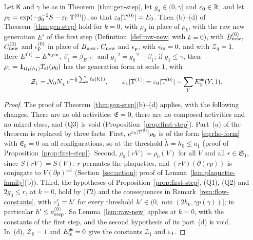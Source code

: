\begin{proposition}\label{prop:gen-one}
Let $\mathsf K$ and $\gamma$ be as in Theorem~\ref{thm:gen-step}, let $g_0\in(0,\gamma]$ and $\varepsilon_0\in\mathbb R$, and let $\rho_0=\exp(-g_0^{-2}S-\varepsilon_0|\mathbb T^{(0)}|)$, so that $\varepsilon_0|\mathbb T^{(0)}|=E_0$. Then (b)--(d) of Theorem~\ref{thm:gen-step} hold for $k=0$, with $\rho_0$ in place of $\rho_k$, with the raw new generation $E'$ of the first step (Definition~\ref{def:raw-new} with $k=0$), with $B^{(0)}_{\rm new}$, $C^{(0)}_{\rm new}$ and $\epsilon^{(0)}_{\rm p}$ in place of $B_{\rm new}$, $C_{\rm new}$ and $\epsilon_{\rm p}$, with $\epsilon_{\rm m}=0$, and with $\mathcal Z_0=1$. Here $E^{(1)}=E'^{\rm sym}$, $\beta_1=\beta_{E^{(1)}}$ and $g_1^{-2}=g_0^{-2}-\beta_1$; if $g_1\le\gamma$, then $\rho_1=\mathbf 1_{\mathfrak U_1(h_1)}T_{\rm sf}(\rho_0)$ has the generation form at scale $1$, with
\[
\mathcal Z_1=\mathcal N_0N_\chi\,e^{-\frac12\sum_b\ell_0(b;1)},\qquad\varepsilon_1|\mathbb T^{(1)}|=\varepsilon_0|\mathbb T^{(0)}|-\sum_YE^\#_{\rm p}(Y,1).
\]
\end{proposition}

\begin{proof}
The proof of Theorem~\ref{thm:gen-step}(b)--(d) applies, with the following changes. There are no old activities: $\mathfrak E=0$, there are no composed activities and no mixed class, and (Q3) is void (Proposition~\ref{prop:first-step}). Part~(a) of the theorem is replaced by three facts. First, $e^{\varepsilon_0|\mathbb T^{(0)}|}\rho_0$ is of the form \eqref{eq:rho-form} with $\mathfrak E_0=0$ on all configurations, so at the threshold $\tilde h=h_0\le a_1$ (proof of Proposition~\ref{prop:first-step}). Second, $\rho_0(rV)=\rho_0(V)$ for all $V$ and all $r\in\mathfrak S_1$, since $S(rV)=S(V)$: $r$ permutes the plaquettes, and $(rV)(\partial(rp))$ is conjugate to $V(\partial p)^{\pm1}$ (Section~\ref{sec:action}; proof of Lemma~\ref{lem:plaquette-family}(b)). Third, the hypotheses of Proposition~\ref{prop:first-step}, (Q1), (Q2) and $2g_0\le r_t$ at $k=0$, hold by ($\Gamma$2) and the consequences in Remark~\ref{rem:flow-constants}, with $\varepsilon'_1=h'$ for every threshold $h'\in(0,\min(2h_0,\gamma p(\gamma))]$; in particular $h'\le a^{(0)}_{\rm step}$. So Lemma~\ref{lem:raw-new} applies at $k=0$, with the constants of the first step, and the second hypothesis of its part~(d) is void. In~(d), $\mathcal Z_0=1$ and $E^\#_{\rm m}=0$ give the constants $\mathcal Z_1$ and $\varepsilon_1$.
\end{proof}

